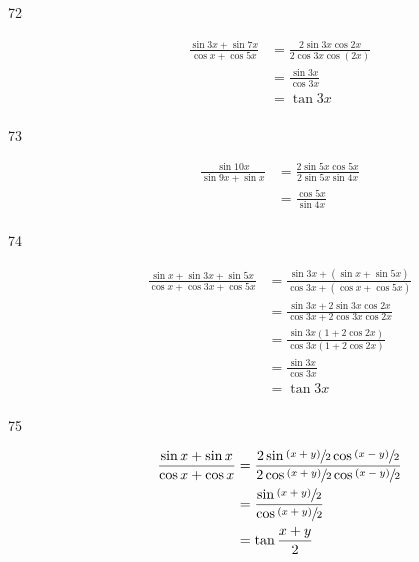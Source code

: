 \documentclass{exam}
\begin{document}
\begin{description}
      \item[72]
        \begin{align*}
          \frac{\sin 3x + \sin 7x}{\cos x + \cos 5x} & = \frac{2 \sin 3x \cos 2x}{2 \cos3x \cos (2x)} \\
                                                    & = \frac{\sin 3x}{\cos 3x} \\
                                                    & = \tan 3x \\
        \end{align*}

      \item[73]
        \begin{align*}
          \frac{\sin 10x}{\sin 9x + \sin x} & = \frac{2 \sin 5x \cos 5x}{2 \sin 5x \sin 4x} \\
                                            & = \frac{\cos 5x}{\sin 4x} \\
        \end{align*}

      \item[74]
        \begin{align*}
          \frac{\sin x + \sin 3x + \sin 5x}{\cos x + \cos 3x + \cos 5x} & = \frac{\sin 3x + (\sin x + \sin 5x)}{\cos 3x + (\cos x + \cos 5x)} \\
                                                                        & = \frac{\sin 3x + 2 \sin 3x \cos 2x}{\cos 3x + 2 \cos 3x \cos 2x} \\
                                                                        & = \frac{\sin 3x (1 + 2 \cos 2x)}{\cos 3x (1 + 2 \cos 2x)} \\
                                                                        & = \frac{\sin 3x}{\cos 3x} \\
                                                                        & = \tan 3x \\
        \end{align*}

      \item[75]
        \begin{align*}
          \frac{\sin x + \sin x}{\cos x + \cos x} & = \frac{2 \sin \sfrac{(x + y)}{2} \cos \sfrac{(x - y)}{2}}{2 \cos \sfrac{(x + y)}{2} \cos \sfrac{(x - y)}{2}} \\
                                                  & = \frac{\sin \sfrac{(x + y)}{2}}{\cos \sfrac{(x + y)}{2}} \\
                                                  & = \tan \frac{x + y}{2} \\
        \end{align*}


\end{description}
\end{document}
